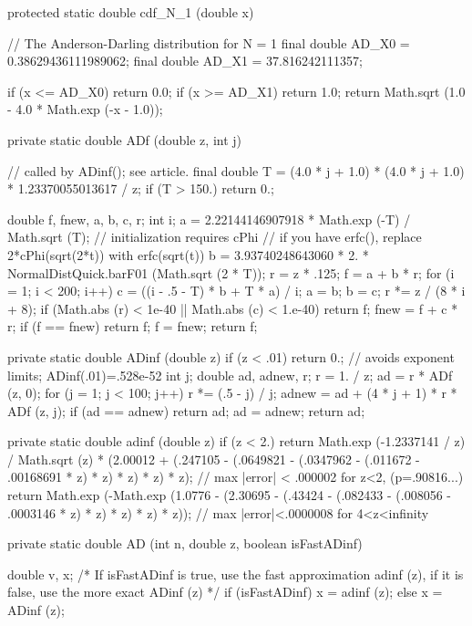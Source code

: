 \begin{code}\begin{hide}
   protected static double cdf_N_1 (double x)
   {
      // The Anderson-Darling distribution for N = 1
      final double AD_X0 = 0.38629436111989062;
      final double AD_X1 = 37.816242111357;

      if (x <= AD_X0)
         return 0.0;
      if (x >= AD_X1)
         return 1.0;
      return Math.sqrt (1.0 - 4.0 * Math.exp (-x - 1.0));
   }

   private static double ADf (double z, int j)
   {                                 // called by ADinf(); see article.
      final double T = (4.0 * j + 1.0) * (4.0 * j + 1.0) * 1.23370055013617 / z;
      if (T > 150.)
         return 0.;

      double f, fnew, a, b, c, r;
      int i;
      a = 2.22144146907918 * Math.exp (-T) / Math.sqrt (T);
      // initialization requires cPhi
      // if you have erfc(), replace 2*cPhi(sqrt(2*t)) with erfc(sqrt(t))
      b = 3.93740248643060 * 2. * NormalDistQuick.barF01 (Math.sqrt (2 * T));
      r = z * .125;
      f = a + b * r;
      for (i = 1; i < 200; i++) {
         c = ((i - .5 - T) * b + T * a) / i;
         a = b;
         b = c;
         r *= z / (8 * i + 8);
         if (Math.abs (r) < 1e-40 || Math.abs (c) < 1.e-40)
            return f;
         fnew = f + c * r;
         if (f == fnew)
            return f;
         f = fnew;
      }
      return f;
   }

   private static double ADinf (double z)
   {
      if (z < .01)
         return 0.;   // avoids exponent limits; ADinf(.01)=.528e-52
      int j;
      double ad, adnew, r;
      r = 1. / z;
      ad = r * ADf (z, 0);
      for (j = 1; j < 100; j++) {
         r *= (.5 - j) / j;
         adnew = ad + (4 * j + 1) * r * ADf (z, j);
         if (ad == adnew) {
            return ad;
         }
         ad = adnew;
      }
      return ad;
   }

   private static double adinf (double z)
   {
      if (z < 2.)
         return Math.exp (-1.2337141 / z) / Math.sqrt (z) * (2.00012 + (.247105 -
               (.0649821 - (.0347962 - (.011672 -
                        .00168691 * z) * z) * z) * z) * z);
      // max |error| < .000002 for z<2, (p=.90816...)
      return
         Math.exp (-Math.exp (1.0776 - (2.30695 - (.43424 - (.082433 - 
                     (.008056 - .0003146 * z) * z) * z) * z) * z));
      // max |error|<.0000008 for 4<z<infinity
   }

   private static double AD (int n, double z, boolean isFastADinf)
   {
      double v, x;
      /* If isFastADinf is true, use the fast approximation adinf (z),
         if it is false, use the more exact ADinf (z) */
      if (isFastADinf)
         x = adinf (z);
      else
         x = ADinf (z);

}
\end{hide}
\end{code}
